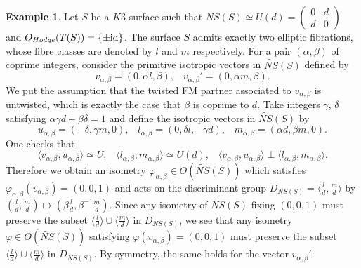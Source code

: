 \documentclass{article}
\theoremstyle{plain}
\theoremstyle{definition}
\newtheorem{example}[theorem]{Example}%
\theoremstyle{remark}
\begin{document}
\begin{example}\label{partner is not always relative moduli}
Let $S$ be a $K3$ surface such that $NS(S) \simeq U(d) = 
         (
           \begin{smallmatrix} 
              0 & d \\
              d & 0 
            \end{smallmatrix}
          )$  
and $O_{Hodge}(T(S)) = \{ \pm {\rm id \/} \} $.             
The surface $S$ admits exactly two elliptic fibrations,  
whose fibre classes are denoted by $l$ and $m$ respectively.  
For a pair $(\alpha , \beta )$ of coprime integers, 
consider the primitive isotropic vectors in $\widetilde{NS}(S)$ defined by 
\begin{equation*}
v_{\alpha , \beta} = (0, \alpha l, \beta ),  \; \; \; 
v_{\alpha , \beta}' = (0, \alpha m, \beta ).   
\end{equation*}
We put the assumption 
that the twisted FM partner associated to $v_{\alpha , \beta}$ is untwisted,  
which is exactly the case that $\beta $ is coprime to $d$.   
Take integers $\gamma $, $\delta $ satisfying 
$\alpha \gamma d + \beta \delta =1$ 
and define the isotropic vectors in $\widetilde{NS}(S)$  by 
\begin{equation*}
u_{\alpha , \beta}  =    (-\delta ,      \gamma m,          0),  \; \; \; 
l_{\alpha , \beta}  =    (0,               \delta l,   -\gamma d),    \; \; \; 
m_{\alpha , \beta}   =    (\alpha d,  \beta m,               0).  
\end{equation*}   
One checks that 
\begin{equation*}
\langle  v_{\alpha , \beta}, u_{\alpha , \beta} \rangle \simeq U,  \; \; \; 
\langle  l_{\alpha , \beta}, m_{\alpha , \beta} \rangle \simeq U(d),  \; \; \; 
\langle  v_{\alpha , \beta}, u_{\alpha , \beta} \rangle \perp \langle  l_{\alpha , \beta}, m_{\alpha , \beta} \rangle .    
\end{equation*} 
Therefore we obtain an isometry $\varphi _{\alpha , \beta} \in O(\widetilde{NS}(S))$
which satisfies 
$\varphi _{\alpha , \beta}(v_{\alpha , \beta}) =  (0, 0, 1)$  
and acts on the discriminant group 
$D_{NS(S)} = \langle \frac{l}{d}, \frac{m}{d} \rangle $ by  
$(\frac{l}{d},  \frac{m}{d}) \mapsto (\beta \frac{l}{d},  \beta ^{-1}\frac{m}{d})$.     
Since any isometry of $\widetilde{NS}(S)$ fixing $(0, 0, 1)$ 
must preserve the subset 
$\langle \frac{l}{d} \rangle \cup \langle \frac{m}{d} \rangle $  
in $D_{NS(S)}$,   
we see that any isometry 
$\varphi \in O(\widetilde{NS}(S))$ satisfying 
$\varphi (v_{\alpha , \beta}) = (0, 0, 1)$  
must preserve the subset 
$\langle \frac{l}{d} \rangle \cup \langle \frac{m}{d} \rangle $  
in $D_{NS(S)}$.  
By symmetry, 
the same holds for the vector $v_{\alpha , \beta}'$.  





\end{example}
\end{document}
